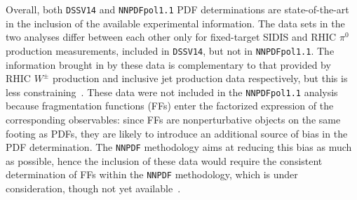 Overall, both {\tt DSSV14} and {\tt NNPDFpol1.1} PDF determinations are 
state-of-the-art in the inclusion of the available experimental information. 
The data sets in the two analyses differ between each other only for 
fixed-target SIDIS and RHIC $\pi^0$ production measurements, included in 
{\tt DSSV14}, but not in {\tt NNPDFpol1.1}. The information brought in by 
these data is complementary to that provided by RHIC $W^\pm$ production and 
inclusive jet production data respectively, but this is less 
constraining~\cite{Nocera:2014gqa}. These data were not included in the 
{\tt NNPDFpol1.1} analysis because fragmentation functions (FFs) enter the 
factorized expression of the corresponding observables: since FFs are 
nonperturbative objects on the same footing as PDFs, they are likely to 
introduce an additional source of bias in the PDF determination. The
{\tt NNPDF} methodology aims at reducing this bias as much as possible, hence 
the inclusion of these data would require the consistent determination 
of FFs within the {\tt NNPDF} methodology, which is under consideration,
though not yet available~\cite{Bertone:2015cwa}. 

